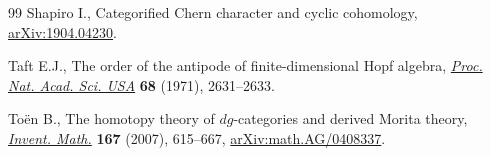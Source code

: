 \documentclass[pdftex]{sigma}
\numberwithin{equation}{section}
\begin{document}
\begin{thebibliography}{99}
Shapiro I., Categorified {C}hern character and cyclic cohomology,
 \href{https://arxiv.org/abs/1904.04230}{arXiv:1904.04230}.

Taft E.J., The order of the antipode of finite-dimensional {H}opf algebra,
 \href{https://doi.org/10.1073/pnas.68.11.2631}{\textit{Proc. Nat. Acad. Sci. USA}} \textbf{68} (1971), 2631--2633.

To\"en B., The homotopy theory of {$dg$}-categories and derived {M}orita
 theory, \href{https://doi.org/10.1007/s00222-006-0025-y}{\textit{Invent. Math.}} \textbf{167} (2007), 615--667,
 \href{https://arxiv.org/abs/math.AG/0408337}{arXiv:math.AG/0408337}.

\end{thebibliography}\LastPageEnding
\end{document}
